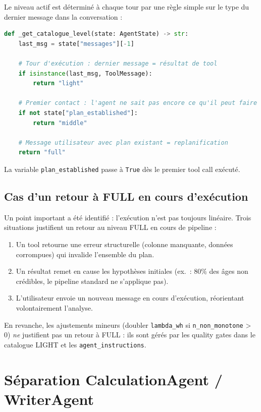 \documentclass[12pt, a4paper]{article}
\begin{document}
Le niveau actif est déterminé à chaque tour par une règle simple sur le type
du dernier message dans la conversation :

\begin{lstlisting}[language=Python, caption={Logique de sélection du niveau de catalogue}]
def _get_catalogue_level(state: AgentState) -> str:
    last_msg = state["messages"][-1]

    # Tour d'exécution : dernier message = résultat de tool
    if isinstance(last_msg, ToolMessage):
        return "light"

    # Premier contact : l'agent ne sait pas encore ce qu'il peut faire
    if not state["plan_established"]:
        return "middle"

    # Message utilisateur avec plan existant = replanification
    return "full"
\end{lstlisting}

La variable \texttt{plan\_established} passe à \texttt{True} dès le premier
tool call exécuté.

\subsection{Cas d'un retour à FULL en cours d'exécution}

Un point important a été identifié : l'exécution n'est pas toujours linéaire.
Trois situations justifient un retour au niveau FULL en cours de pipeline :

\begin{enumerate}
  \item Un tool retourne une erreur structurelle (colonne manquante, données
    corrompues) qui invalide l'ensemble du plan.
  \item Un résultat remet en cause les hypothèses initiales (ex.~: 80\% des
    âges non crédibles, le pipeline standard ne s'applique pas).
  \item L'utilisateur envoie un nouveau message en cours d'exécution,
    réorientant volontairement l'analyse.
\end{enumerate}

En revanche, les ajustements mineurs (doubler \texttt{lambda\_wh} si
\texttt{n\_non\_monotone} > 0) \emph{ne} justifient pas un retour à FULL :
ils sont gérés par les quality gates dans le catalogue LIGHT et les
\texttt{agent\_instructions}.

\section{Séparation CalculationAgent / WriterAgent}
\end{document}
